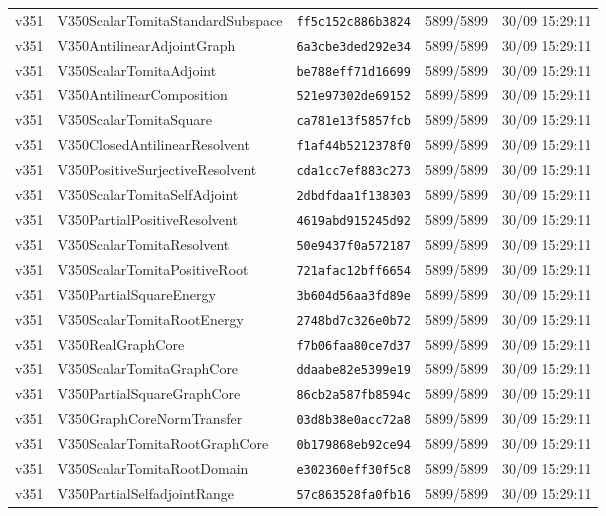 \documentclass[11pt]{article}
\theoremstyle{definition}\newtheorem{deriv}{Derivation}
\begin{document}
{\begin{longtable}{@{}lllll@{}}
v351 & V350ScalarTomitaStandardSubspace & \texttt{ff5c152c886b3824} & 5899/5899 & 30/09 15:29:11 \\
v351 & V350AntilinearAdjointGraph & \texttt{6a3cbe3ded292e34} & 5899/5899 & 30/09 15:29:11 \\
v351 & V350ScalarTomitaAdjoint & \texttt{be788eff71d16699} & 5899/5899 & 30/09 15:29:11 \\
v351 & V350AntilinearComposition & \texttt{521e97302de69152} & 5899/5899 & 30/09 15:29:11 \\
v351 & V350ScalarTomitaSquare & \texttt{ca781e13f5857fcb} & 5899/5899 & 30/09 15:29:11 \\
v351 & V350ClosedAntilinearResolvent & \texttt{f1af44b5212378f0} & 5899/5899 & 30/09 15:29:11 \\
v351 & V350PositiveSurjectiveResolvent & \texttt{cda1cc7ef883c273} & 5899/5899 & 30/09 15:29:11 \\
v351 & V350ScalarTomitaSelfAdjoint & \texttt{2dbdfdaa1f138303} & 5899/5899 & 30/09 15:29:11 \\
v351 & V350PartialPositiveResolvent & \texttt{4619abd915245d92} & 5899/5899 & 30/09 15:29:11 \\
v351 & V350ScalarTomitaResolvent & \texttt{50e9437f0a572187} & 5899/5899 & 30/09 15:29:11 \\
v351 & V350ScalarTomitaPositiveRoot & \texttt{721afac12bff6654} & 5899/5899 & 30/09 15:29:11 \\
v351 & V350PartialSquareEnergy & \texttt{3b604d56aa3fd89e} & 5899/5899 & 30/09 15:29:11 \\
v351 & V350ScalarTomitaRootEnergy & \texttt{2748bd7c326e0b72} & 5899/5899 & 30/09 15:29:11 \\
v351 & V350RealGraphCore & \texttt{f7b06faa80ce7d37} & 5899/5899 & 30/09 15:29:11 \\
v351 & V350ScalarTomitaGraphCore & \texttt{ddaabe82e5399e19} & 5899/5899 & 30/09 15:29:11 \\
v351 & V350PartialSquareGraphCore & \texttt{86cb2a587fb8594c} & 5899/5899 & 30/09 15:29:11 \\
v351 & V350GraphCoreNormTransfer & \texttt{03d8b38e0acc72a8} & 5899/5899 & 30/09 15:29:11 \\
v351 & V350ScalarTomitaRootGraphCore & \texttt{0b179868eb92ce94} & 5899/5899 & 30/09 15:29:11 \\
v351 & V350ScalarTomitaRootDomain & \texttt{e302360eff30f5c8} & 5899/5899 & 30/09 15:29:11 \\
v351 & V350PartialSelfadjointRange & \texttt{57c863528fa0fb16} & 5899/5899 & 30/09 15:29:11 \\

\end{longtable}}
\end{document}
